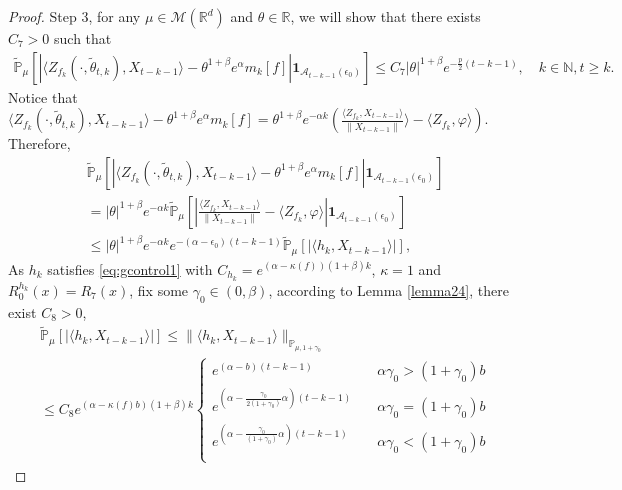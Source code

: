 \documentclass[12pt,oneside,english]{amsart}
\theoremstyle{plain}
\theoremstyle{definition}
\numberwithin{equation}{section}
\begin{document}
\begin{proof}
Step 3, for any $\mu \in \mathcal{M}(\mathbb{R}^d)$ and $\theta\in \mathbb{R}$, we will show that there exists $C_7>0$ such that
\begin{align}
\label{eq:31step3}
    \mathbb{\tilde{P}}_{\mu}\left[\left|\langle Z_{f_k}(\cdot,\tilde{\theta}_{t,k}),X_{t-k-1}\rangle-\theta^{1+\beta}e^{\alpha}m_k[f]\right|\mathbf{1}_{\mathcal{A}_{t-k-1}(\epsilon_0)}\right]\leq C_7|\theta|^{1+\beta} e^{-\frac{p}{2}(t-k-1)},\quad k\in \mathbb{N}, t\geq k.
\end{align}
    Notice that $\langle Z_{f_k}(\cdot,\tilde{\theta}_{t,k}),X_{t-k-1}\rangle-\theta^{1+\beta}e^{\alpha}m_k[f]=\theta^{1+\beta}e^{-\alpha k}(\frac{\langle Z_{f_k},X_{t-k-1}\rangle}{\|X_{t-k-1}\|} \rangle-\langle Z_{f_k},\varphi\rangle)$. Therefore,
\begin{align}
        &\mathbb{\tilde{P}}_{\mu}\left[\left|\langle Z_{f_k}(\cdot,\tilde{\theta}_{t,k}),X_{t-k-1}\rangle-\theta^{1+\beta}e^{\alpha}m_k[f]\right|\mathbf{1}_{\mathcal{A}_{t-k-1}(\epsilon_0)}\right]\\
    &=|\theta|^{1+\beta}e^{-\alpha k}\mathbb{\tilde{P}}_{\mu}\left[\left|\frac{\langle Z_{f_k},X_{t-k-1}\rangle}{\|X_{t-k-1}\|}-\langle Z_{f_k},\varphi\rangle\right|\mathbf{1}_{\mathcal{A}_{t-k-1}(\epsilon_0)}\right]\nonumber\\
    &\leq |\theta|^{1+\beta}e^{-\alpha k}e^{-(\alpha-\epsilon_0)(t-k-1)}\mathbb{\tilde{P}}_{\mu}\left[\left|\langle h_k,X_{t-k-1}\rangle\right|\right],\label{II1}
\end{align}
As $h_k$ satisfies \eqref{eq:gcontrol1} with $C_{h_k}=e^{(\alpha-\kappa(f))(1+\beta)k}$, $\kappa=1$ and $R_0^{h_k}(x)=R_7(x)$, fix some $\gamma_0\in(0,\beta)$, according to Lemma \ref{lemma24}, there exist $C_8>0$,
\begin{align}
    &\mathbb{\tilde{P}}_{\mu}\left[\left|\langle h_k,X_{t-k-1}\rangle\right|\right]\leq \|\langle h_k, X_{t-k-1}\rangle\|_{\mathbb{P}_{\mu,1+\gamma_0}}\\
    &\leq C_8 e^{(\alpha-\kappa(f)b)(1+\beta)k}
    \begin{cases}
    e^{(\alpha-b)(t-k-1)}\quad &\alpha\gamma_0>(1+\gamma_0)b\\
    e^{(\alpha-\frac{\gamma_0}{2(1+\gamma_0)}\alpha)(t-k-1)}\quad &\alpha\gamma_0=(1+\gamma_0)b\\
    e^{(\alpha-\frac{\gamma_0}{(1+\gamma_0)}\alpha)(t-k-1)}\quad &\alpha\gamma_0<(1+\gamma_0)b\\

\end{cases}
\end{align}
\end{proof}
\end{document}
